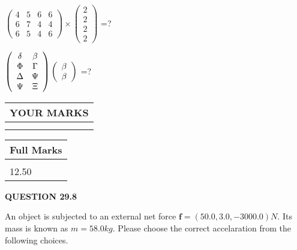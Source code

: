 \documentclass[12pt]{article}
\begin{document}
  
 
$ \left( \begin{array}{ccccccccc}
           4  & 
           5  & 
           6  & 
           6  \\ 
           6  & 
           7  & 
           4  & 
           4  \\ 
           6  & 
           5  & 
           4  & 
           6
\end{array}\right) \times
\left( \begin{array}{c}
           2  \\ 
           2  \\ 
           2  \\ 
           2
\end{array}\right) $ =?
 
 
$  %
 \left( \begin{array}
 {
 c
 c
 }
 \delta & 
 \beta \\ 
 \Phi & 
 \Gamma \\ 
 \Delta & 
 \Psi \\ 
 \Psi & 
                    \Xi
 \end{array} \right)
 \left( \begin{array}
 {
 c
 }
 \beta \\ 
 \beta
 \end{array} \right)
$ =?
 

 

 
\vspace{0.3in}
  
\vspace{0.2in}
  
\noindent\begin{tabular}{|l|}
\hline
 YOUR MARKS  \\
\hline
 \\ 
 \\ 
\hline
\end{tabular}
\hspace{0.05in} \begin{tabular}{|l|}
\hline
 Full Marks  \\
\hline
 \\ 
12.50 \\
\hline
\end{tabular}
{\textbf{\Large{QUESTION
29.8 
}}}
  
  
 
An object is subjected to an external net force $\mathbf{f}=
(50.0 , 3.0 , -3000.0) N$.
Its mass is known as $m= %
58.0 kg$.
Please choose the correct accelaration from the following choices.
  
\end{document}
